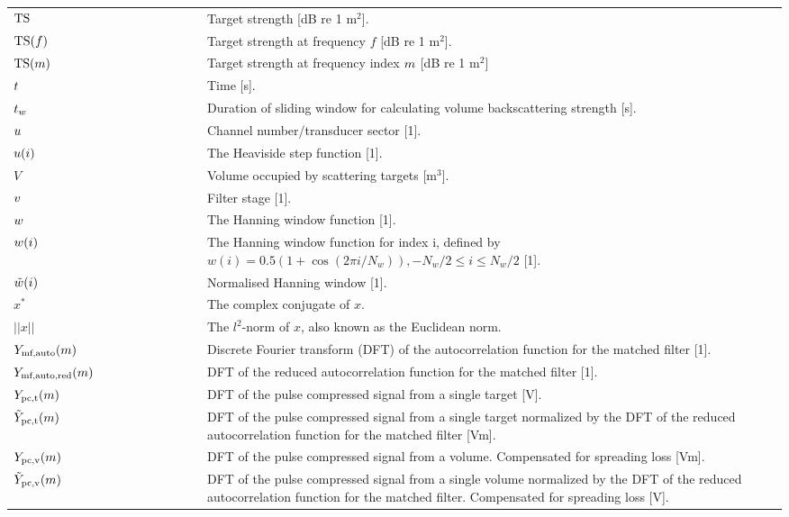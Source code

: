 \documentclass[preprint,12pt,TurnOnLineNumbers]{JASAnew}
\begin{document}
\begin{longtable}{p{0.25\linewidth} p{0.75\linewidth}}
$\textrm{TS}$ & Target strength [dB re 1 $\textrm{m}^2$].\\
$\textrm{TS}(f)$ & Target strength at frequency $f$ [dB re 1 $\textrm{m}^2$].\\
$\textrm{TS}(m)$ & Target strength at frequency index $m$ [dB re 1 $\textrm{m}^{2}$]\\

$t$ &  Time [s].\\
$t_w$ & Duration of sliding window for calculating volume backscattering strength [s].\\

$u$ & Channel number/transducer sector [1].\\
$u(i)$ & The Heaviside step function [1]. \\
$V$ & Volume occupied by scattering targets [$\textrm{m}^3$].\\
$v$ & Filter stage [1].\\

$w$ & The Hanning window function [1].\\
$w(i)$ & The Hanning window function for index i, defined by $w(i) = 0.5(1+\cos (2\pi i /N_w)), -N_w/2 \leq i \leq N_w/2$ [1].\\
$\tilde{w}(i)$ & Normalised Hanning window [1].\\

$x^*$ & The complex conjugate of $x$.\\
$||x||$ & The $l^2$-norm of $x$, also known as the Euclidean norm.\\

$Y_{\textrm{mf,auto}}(m)$ & Discrete Fourier transform (DFT) of the autocorrelation function for the matched filter [1].\\
$Y_{\textrm{mf,auto,red}}(m)$ & DFT of the reduced autocorrelation function for the matched filter [1].\\
$Y_{\textrm{pc,t}}(m)$ & DFT of the pulse compressed signal from a single target [V].\\
$\tilde{Y}_{\textrm{pc,t}}(m)$ & DFT of the pulse compressed signal from a single target 
normalized by the DFT of the reduced autocorrelation function for the matched filter [Vm].\\
$Y_{\textrm{pc,v}}(m)$ & DFT of the pulse compressed signal from a volume. Compensated for spreading loss [Vm].\\
$\tilde{Y}_{\textrm{pc,v}}(m)$ & DFT of the pulse compressed signal from a single volume normalized by the DFT of the reduced autocorrelation function for the matched filter.  Compensated for spreading loss [V].\\


\end{longtable}
\end{document}
